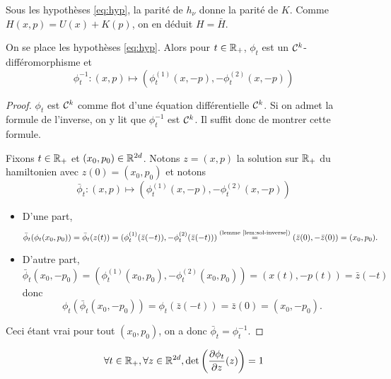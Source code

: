 \documentclass[10pt,a4paper]{article}
\begin{document}
\begin{Rque}\label{rque:Hbar}
	Sous les hypothèses \eqref{eq:hyp}, la parité de $h_\nu$ donne la parité de $K$. Comme $H(x,p) = U(x)+K(p)$, on en déduit $H = \bar H$.
\end{Rque}

\begin{Prop}[réversibilité]\label{prop:rev}
	On se place les hypothèses \eqref{eq:hyp}. Alors pour $t \in \mathbb{R}_+$, $\phi_t$ est un $\mathcal{C}^k$-différomorphisme et
	$$
	\phi_t^{-1} : (x,p) \mapsto (\phi_t^{(1)}(x, -p), - \phi_t^{(2)}(x, -p))
	$$
\end{Prop}
\begin{proof}
	$\phi_t$ est $\mathcal{C}^k$ comme flot d'une équation différentielle $\mathcal{C}^k$. Si on admet la formule de l'inverse, on y lit que $\phi_t^{-1}$ est $\mathcal{C}^k$. Il suffit donc de montrer cette formule.

	Fixons $t \in \mathbb{R}_+$ et $(x_0,p_0) \in \mathbb{R}^{2d}$. Notons $z=(x,p)$ la solution sur $\mathbb{R}_+$ du hamiltonien avec $z(0) = (x_0,p_0)$ et notons
	$$
	\bar \phi_t : (x,p) \mapsto (\phi_t^{(1)}(x, -p), - \phi_t^{(2)}(x, -p))
	$$
        \begin{itemize}
		\item D'une part,
		$$
		\bar \phi_t(\phi_t(x_0,p_0)) = \bar \phi_t(z(t)) = (\phi_t^{(1)}(\bar z(-t)), - \phi_t^{(2)}(\bar z(-t))) \overset{\text{(lemme \ref{lem:sol-inverse})}}{=} (\bar z(0), - \bar z(0)) = (x_0, p_0).
		$$

		\item D'autre part,
		$$
		\bar \phi_t(x_0,-p_0) = (\phi_t^{(1)}(x_0, p_0), - \phi_t^{(2)}(x_0, p_0)) = (x(t),-p(t)) = \bar z(-t)
		$$
		donc
		$$
		\phi_t (\bar \phi_t(x_0,-p_0)) = \phi_t(\bar z(-t)) = \bar{z}(0) = (x_0,-p_0).
		$$
	\end{itemize}
	Ceci étant vrai pour tout $(x_0,p_0)$, on a donc $\bar \phi_t = \phi_t^{-1}$.
\end{proof}


\begin{Prop}\label{prop:vol}
	$$
	\forall t \in \mathbb{R}_+, \forall z \in \mathbb{R}^{2d}, \det \left( \frac{\partial \phi_t}{\partial z}(z) \right) = 1
	$$
\end{Prop}
\end{document}
